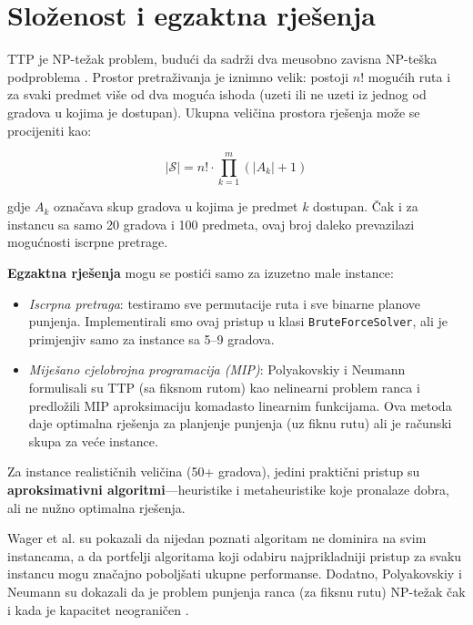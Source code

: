 \documentclass[12pt,a4paper]{article}
\begin{document}
\section{Složenost i egzaktna rje\v{s}enja}

TTP je NP-te\v{z}ak problem, budu\'{c}i da sadr\v{z}i dva me\dj{}usobno zavisna NP-te\v{s}ka podproblema \cite{polyakovskiy2014}. Prostor pretra\v{z}ivanja je iznimno velik: postoji $n!$ mogu\'{c}ih ruta i za svaki predmet vi\v{s}e od dva mogu\'{c}a ishoda (uzeti ili ne uzeti iz jednog od gradova u kojima je dostupan). Ukupna veli\v{c}ina prostora rje\v{s}enja mo\v{z}e se procijeniti kao:

\begin{equation}
    |\mathcal{S}| = n! \cdot \prod_{k=1}^{m} (|A_k| + 1)
\end{equation}

gdje $A_k$ ozna\v{c}ava skup gradova u kojima je predmet $k$ dostupan. Čak i za instancu sa samo 20 gradova i 100 predmeta, ovaj broj daleko prevazilazi mogu\'{c}nosti iscrpne pretrage.

\textbf{Egzaktna rje\v{s}enja} mogu se posti\'{c}i samo za izuzetno male instance:
\begin{itemize}
    \item \textit{Iscrpna pretraga}: testiramo sve permutacije ruta i sve binarne planove punjenja. Implementirali smo ovaj pristup u klasi \texttt{BruteForceSolver}, ali je primjenjiv samo za instance sa 5--9 gradova.
    \item \textit{Mije\v{s}ano cjelobrojna programacija (MIP)}: Polyakovskiy i Neumann \cite{polyakovskiy2015} formulisali su TTP (sa fiksnom rutom) kao nelinearni problem ranca i predlo\v{z}ili MIP aproksimaciju komadasto linearnim funkcijama. Ova metoda daje optimalna rje\v{s}enja za planjenje punjenja (uz fiknu rutu) ali je ra\v{c}unski skupa za ve\'{c}e instance.
\end{itemize}

Za instance realisti\v{c}nih veli\v{c}ina (50+ gradova), jedini prakti\v{c}ni pristup su \textbf{aproksimativni algoritmi}---heuristike i metaheuristike koje pronalaze dobra, ali ne nu\v{z}no optimalna rje\v{s}enja.

Wager et al. \cite{wagner_selection} su pokazali da nijedan poznati algoritam ne dominira na svim instancama, a da portfelji algoritama koji odabiru najprikladniji pristup za svaku instancu mogu zna\v{c}ajno pobolj\v{s}ati ukupne performanse. Dodatno, Polyakovskiy i Neumann su dokazali da je problem punjenja ranca (za fiksnu rutu) NP-te\v{z}ak \v{c}ak i kada je kapacitet neograni\v{c}en \cite{polyakovskiy2015}.
\end{document}
